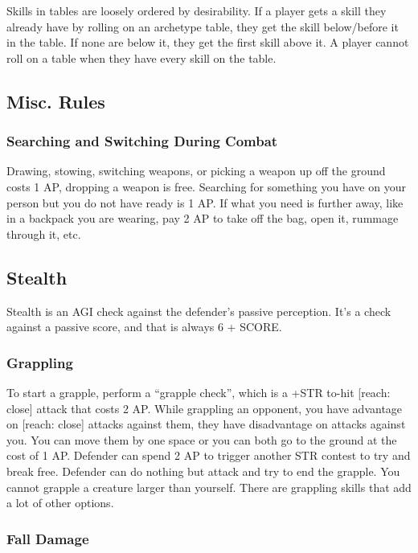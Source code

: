 \documentclass[
  letterpaper,
  DIV=11,
  numbers=noendperiod]{scrartcl}
\begin{document}
Skills in tables are loosely ordered by desirability. If a player gets a
skill they already have by rolling on an archetype table, they get the
skill below/before it in the table. If none are below it, they get the
first skill above it. A player cannot roll on a table when they have
every skill on the table.

\subsection{Misc. Rules}\label{misc.-rules}

\subsubsection{Searching and Switching During
Combat}\label{searching-and-switching-during-combat}

Drawing, stowing, switching weapons, or picking a weapon up off the
ground costs 1 AP, dropping a weapon is free. Searching for something
you have on your person but you do not have ready is 1 AP. If what you
need is further away, like in a backpack you are wearing, pay 2 AP to
take off the bag, open it, rummage through it, etc.

\subsection{Stealth}\label{stealth}

Stealth is an AGI check against the defender's passive perception. It's
a check against a passive score, and that is always 6 + SCORE.

\subsubsection{Grappling}\label{grappling}

To start a grapple, perform a ``grapple check'', which is a +STR to-hit
{[}reach: close{]} attack that costs 2 AP. While grappling an opponent,
you have advantage on {[}reach: close{]} attacks against them, they have
disadvantage on attacks against you. You can move them by one space or
you can both go to the ground at the cost of 1 AP. Defender can spend 2
AP to trigger another STR contest to try and break free. Defender can do
nothing but attack and try to end the grapple. You cannot grapple a
creature larger than yourself. There are grappling skills that add a lot
of other options.

\subsubsection{Fall Damage}\label{fall-damage}
\end{document}
